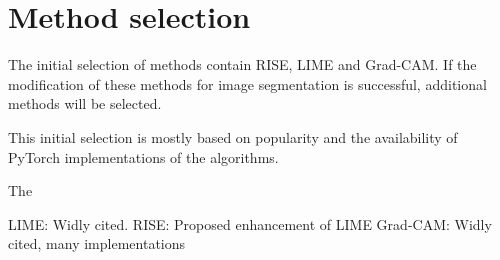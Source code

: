 \section{Method selection}
The initial selection of methods contain RISE, LIME and Grad-CAM. If the modification of these methods for image segmentation is successful, additional methods will be selected.

This initial selection is mostly based on popularity and the availability of PyTorch implementations of the algorithms.

The

LIME: Widly cited.
RISE: Proposed enhancement of LIME
Grad-CAM: Widly cited, many implementations
